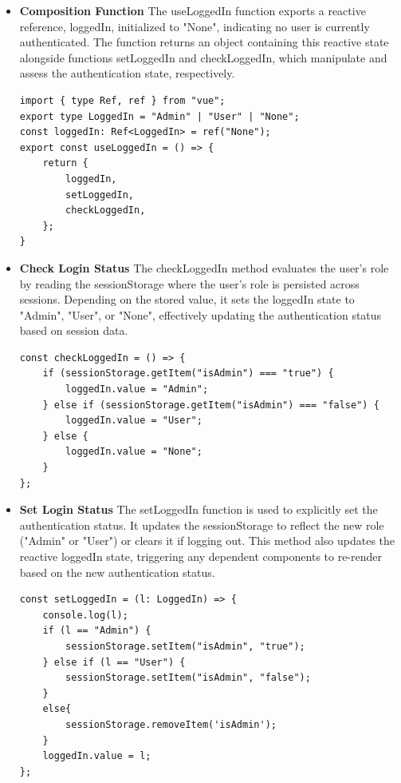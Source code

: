 \begin{itemize}
\item \textbf{Composition Function}
The useLoggedIn function exports a reactive reference, loggedIn, initialized to "None", indicating no user is currently authenticated. The function returns an object containing this reactive state alongside functions setLoggedIn and checkLoggedIn, which manipulate and assess the authentication state, respectively.
\begin{lstlisting}[]
import { type Ref, ref } from "vue";
export type LoggedIn = "Admin" | "User" | "None";
const loggedIn: Ref<LoggedIn> = ref("None");
export const useLoggedIn = () => {
    return {
        loggedIn,
        setLoggedIn,
        checkLoggedIn,
    };
}
\end{lstlisting}
\item \textbf{Check Login Status}
The checkLoggedIn method evaluates the user's role by reading the sessionStorage where the user's role is persisted across sessions. Depending on the stored value, it sets the loggedIn state to "Admin", "User", or "None", effectively updating the authentication status based on session data.

\begin{lstlisting}[]
const checkLoggedIn = () => {
    if (sessionStorage.getItem("isAdmin") === "true") {
        loggedIn.value = "Admin";
    } else if (sessionStorage.getItem("isAdmin") === "false") {
        loggedIn.value = "User";
    } else {
        loggedIn.value = "None";
    }
};
\end{lstlisting}
\item \textbf{Set Login Status}
The setLoggedIn function is used to explicitly set the authentication status. It updates the sessionStorage to reflect the new role ("Admin" or "User") or clears it if logging out. This method also updates the reactive loggedIn state, triggering any dependent components to re-render based on the new authentication status.

\begin{lstlisting}[]
const setLoggedIn = (l: LoggedIn) => {
    console.log(l);
    if (l == "Admin") {
        sessionStorage.setItem("isAdmin", "true");
    } else if (l == "User") {
        sessionStorage.setItem("isAdmin", "false");
    }
    else{
        sessionStorage.removeItem('isAdmin');
    }
    loggedIn.value = l;
};
\end{lstlisting}
\end{itemize}

